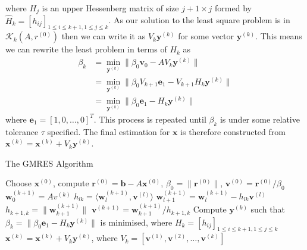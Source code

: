  where $H_j$ is an upper Hessenberg matrix of size $j + 1\times j$ formed by $\hat{H}_k = [h_{ij}]_{1 \leq i \leq k+1, 1 \leq j \leq k}$. As our solution to the least square problem is in $\mathcal{K}_k(A,r^{(0)})$ then we can write it as $V_k\bm{y}^{(k)}$ for some vector $\bm{y}^{(k)}$. This means we can rewrite the least problem in terms of $H_k$ as
 \begin{equation*}
 \begin{aligned}
          \beta_k &= \min\limits_{\bm{y}^{(k)}} \lVert  \beta_0 \bm{v}_0 - AV_k\bm{y}^{(k)} \rVert \\
          &= \min\limits_{\bm{y}^{(k)}} \lVert \beta_0 V_{k+1} \bm{e}_1 - V_{k+1}H_k\bm{y}^{(k)} \rVert \\
          &= \min\limits_{\bm{y}^{(k)}} \lVert \beta_0 \bm{e}_1 - H_k\bm{y}^{(k)} \rVert
 \end{aligned}
 \end{equation*}
where $\bm{e}_1 = [1,0,\dots,0]^T$. This process is repeated until $\beta_k$ is under some relative tolerance $\tau$ specified. The final estimation for $\bm{x}$ is therefore constructed from $\bm{x}^{(k)} = \bm{x}^{(k)} + V_k\bm{y}^{(k)}$.
\begin{algorithm}
\caption{The GMRES Algorithm}\label{alg:GMRES}
\begin{algorithmic}[1]
\State Choose $\bm{x}^{(0)}$, compute $\bm{r}^{(0)}=\bm{b}-A\bm{x}^{(0)}$, $\beta_0 = \lVert \bm{r}^{(0)} \rVert$, $\bm{v}^{(0)} = \bm{r}^{(0)}/\beta_0$
\State $\bm{w}_0^{(k+1)} = Av^{(k)}$
\State $h_{lk}=\langle \bm{w}_l^{(k+1)}, \bm{v}^{(l)} \rangle$
\State $\bm{w}_{l+1}^{(k+1)} = \bm{w}_l^{(k+1)} - h_{lk}\bm{v}^{(l)}$
\EndFor
\State $h_{k+1,k}=\lVert \bm{w}_{k+1}^{(k+1)} \rVert$
\State $\bm{v}^{(k+1)} = \bm{w}_{k+1}^{(k+1)}/h_{k+1,k}$
\State Compute $\bm{y}^{(k)}$ such that $\beta_k = \lVert \beta_0 \bm{e}_1 - H_k  \bm{y}^{(k)} \rVert$ is minimised, where
\State $H_k = [h_{ij}]_{1 \leq i \leq k+1, 1 \leq j \leq k}$
\EndFor
\State $\bm{x}^{(k)} = \bm{x}^{(k)} + V_k\bm{y}^{(k)}$, where $V_k = [\bm{v}^{(1)},\bm{v}^{(2)},\dots,\bm{v}^{(k)}]$
\end{algorithmic}
\end{algorithm}

